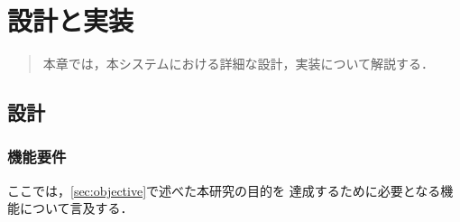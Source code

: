 \chapter{設計と実装}
\begin{large}
\begin{quote}
本章では，本システムにおける詳細な設計，実装について解説する．
\end{quote}
\end{large}
\clearpage


\section{設計}

\subsection{機能要件}
ここでは，\ref{sec:objective}で述べた本研究の目的を
達成するために必要となる機能について言及する．

